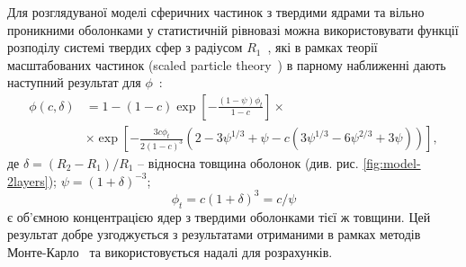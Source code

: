 \documentclass[14pt,twoside]{vakthesis}
\begin{document}
Для розглядуваної моделі сферичних частинок з твердими ядрами та вільно проникними оболонками у статистичній рівновазі можна використовувати  функції розподілу системі твердих сфер з радіусом $R_1$~\cite{Wertheim1963, Lebowitz1964}, які в рамках теорії масштабованих частинок (scaled particle theory~\cite{Reiss1959}) в парному наближенні дають наступний результат для $\phi$~\cite{RikvoldP.1985}: 
\begin{equation}\label{eq:phi_pen}
\begin{split}
\phi(c,\delta) &= 1 - (1-c)\exp{\left[ -\frac{(1-\psi)\phi_t}{1-c} \right]} \times \\
&\times\exp{\left[ -\frac{3c\phi_t}{2(1-c)^3} \left( 2 - 3
	\psi^{1/3} + \psi - c \left( 3\psi^{1/3} - 6\psi^{2/3} +3\psi
	\right) \right) \right]},
\end{split}
\end{equation}
де $\delta = (R_2 - R_1)/R_1$ -- відносна товщина оболонок (див. рис. \ref{fig:model-2layers}); $\psi=(1+\delta)^{-3}$; 
\begin{equation}\label{eq:phi-hard}
\phi_t = c (1+\delta)^3 = c/\psi
\end{equation}
є об'ємною концентрацією ядер з твердими оболонками тієї ж товщини.
Цей результат добре узгоджується з результатами отриманими в рамках методів Монте-Карло~\cite{Rotter2003} та використовується надалі для розрахунків.
\end{document}
